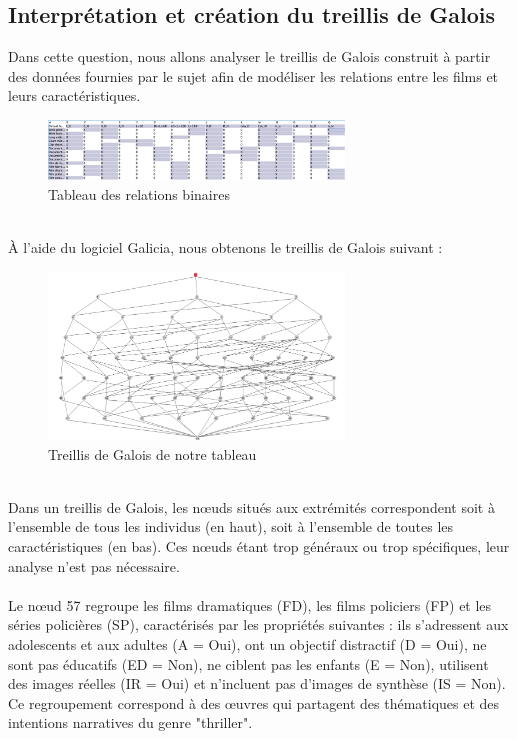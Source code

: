 \documentclass{article}
\begin{document}
\subsection{Interprétation et création du treillis de Galois}
Dans cette question, nous allons analyser le treillis de Galois construit à partir des données fournies par le sujet afin de modéliser les relations entre les films et leurs caractéristiques.
\begin{figure}[h]
    \centering
    \includegraphics[width=0.7\textwidth]{tableau.png}
    \caption{Tableau des relations binaires}
    \label{fig:tableau} 
\end{figure}
\\
À l'aide du logiciel Galicia, nous obtenons le treillis de Galois suivant :
\begin{figure}[h]
    \centering
    \includegraphics[width=0.7\textwidth]{treillis.png}
    \caption{Treillis de Galois de notre tableau}
    \label{fig:treillis} 
\end{figure}
\\
Dans un treillis de Galois, les nœuds situés aux extrémités correspondent soit à l’ensemble de tous les individus (en haut), soit à l’ensemble de toutes les caractéristiques (en bas). Ces nœuds étant trop généraux ou trop spécifiques, leur analyse n’est pas nécessaire.
\\
\\
Le nœud 57 regroupe les films dramatiques (FD), les films policiers (FP) et les séries policières (SP), caractérisés par les propriétés suivantes : ils s’adressent aux adolescents et aux adultes (A = Oui), ont un objectif distractif (D = Oui), ne sont pas éducatifs (ED = Non), ne ciblent pas les enfants (E = Non), utilisent des images réelles (IR = Oui) et n’incluent pas d’images de synthèse (IS = Non). Ce regroupement correspond à des œuvres qui partagent des thématiques et des intentions narratives du genre "thriller".
\end{document}
